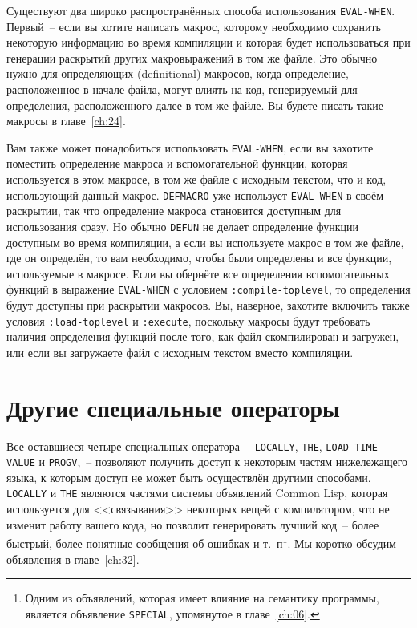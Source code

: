 Существуют два широко распространённых способа использования \lstinline{EVAL-WHEN}. Первый~--
если вы хотите написать макрос, которому необходимо сохранить некоторую информацию во
время компиляции и которая будет использоваться при генерации раскрытий других
макровыражений в том же файле.  Это обычно нужно для определяющих (definitional)
макросов, когда определение, расположенное в начале файла, могут влиять на код,
генерируемый для определения, расположенного далее в том же файле.  Вы будете писать такие
макросы в главе~\ref{ch:24}.

Вам также может понадобиться использовать \lstinline{EVAL-WHEN}, если вы захотите поместить
определение макроса и вспомогательной функции, которая используется в этом макросе, в том
же файле с исходным текстом, что и код, использующий данный макрос. \lstinline{DEFMACRO} уже
использует \lstinline{EVAL-WHEN} в своём раскрытии, так что определение макроса становится
доступным для использования сразу.  Но обычно \lstinline{DEFUN} не делает определение функции
доступным во время компиляции, а если вы используете макрос в том же файле, где он
определён, то вам необходимо, чтобы были определены и все функции, используемые в
макросе. Если вы обернёте все определения вспомогательных функций в выражение
\lstinline{EVAL-WHEN} с условием \lstinline{:compile-toplevel}, то определения будут доступны при
раскрытии макросов. Вы, наверное, захотите включить также условия \lstinline{:load-toplevel} и
\lstinline{:execute}, поскольку макросы будут требовать наличия определения функций после того,
как файл скомпилирован и загружен, или если вы загружаете файл с исходным текстом вместо
компиляции.

\section{Другие специальные операторы}

Все оставшиеся четыре специальных оператора~-- \lstinline{LOCALLY}, \lstinline{THE},
\lstinline{LOAD-TIME-VALUE} и \lstinline{PROGV},~-- позволяют получить доступ к некоторым
частям нижележащего языка, к которым доступ не может быть осуществлён другими способами.
\lstinline{LOCALLY} и \lstinline{THE} являются частями системы объявлений Common Lisp,
которая используется для <<связывания>> некоторых вещей с компилятором, что не изменит
работу вашего кода, но позволит генерировать лучший код~-- более быстрый, более понятные
сообщения об ошибках и т.~п\footnote{Одним из объявлений, которая имеет влияние на
  семантику программы, является объявление \lstinline{SPECIAL}, упомянутое в
  главе~\ref{ch:06}.}\hspace{\footnotenegspace}. Мы коротко обсудим объявления в
главе~\ref{ch:32}.

